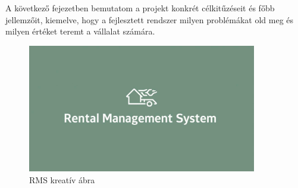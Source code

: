 \vspace{1em}
\noindent A következő fejezetben bemutatom a projekt konkrét célkitűzéseit és főbb jellemzőit, 
kiemelve, hogy a fejlesztett rendszer milyen problémákat old meg és milyen értéket teremt a vállalat számára.
\begin{figure}[H]
    \centering
    \includegraphics[width=100mm, keepaspectratio]{figures/rms.jpg}
    \caption{RMS kreatív ábra}
    \label{fig:rms}
\end{figure}
